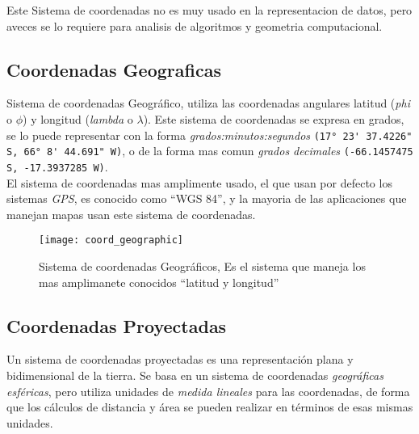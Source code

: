         Este Sistema de coordenadas no es muy usado en la representacion de datos, pero aveces se lo requiere para analisis de algoritmos y geometria computacional.

      \subsection{Coordenadas Geograficas} %
      \label{sub:coordenadas_geograficas}
        Sistema de coordenadas Geográfico, utiliza las coordenadas angulares latitud  (\emph{phi} o ${\phi}$) y longitud (\emph{lambda} o ${\lambda}$). Este sistema de coordenadas se expresa en grados, se lo puede representar con la forma \emph{grados:minutos:segundos }\verb|(17° 23' 37.4226" S, 66° 8' 44.691" W)|, o de la forma mas comun \emph{grados decimales} \verb|(-66.1457475 S, -17.3937285 W)|.\\

        El sistema de coordenadas  mas amplimente usado, el que usan por defecto los sistemas \emph{GPS}, es conocido como ``WGS 84'', y la mayoria de las aplicaciones que manejan mapas usan este sistema de coordenadas.\\

        \begin{figure}[H]
          \begin{center}
            \texttt{[image: coord\_geographic]}
          \end{center}
          \caption[Sistema de coordenadas Geográficos]{Sistema de coordenadas Geográficos, Es el sistema que maneja los mas amplimanete conocidos ``latitud y longitud''}
          \label{fig:coord_geographic}
        \end{figure}


      \subsection{Coordenadas Proyectadas} %
      \label{sub:coordenadas_proyectadas}
        Un sistema de coordenadas proyectadas es una representación plana y bidimensional de la  tierra. Se basa en un sistema de coordenadas \emph{geográficas esf\'ericas}, pero utiliza unidades de \emph{medida lineales} para las coordenadas, de forma que los cálculos de distancia y área se pueden realizar en términos de esas mismas unidades.\cite{projected} \\

